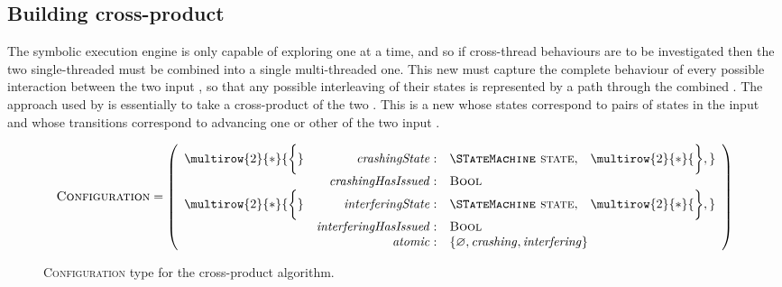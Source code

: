 \subsection{Building cross-product {\StateMachines}}
\label{sect:using:build_cross_product}



The symbolic execution engine is only capable of exploring one
{\StateMachine} at a time, and so if cross-thread behaviours are to be
investigated then the two single-threaded {\StateMachines} must be
combined into a single multi-threaded one.  This new {\StateMachine}
must capture the complete behaviour of every possible interaction
between the two input {\StateMachines}, so that any possible
interleaving of their states is represented by a path through the
combined {\StateMachine}.  The approach used by {\technique} is
essentially to take a cross-product of the two {\StateMachines}.  This
is a new {\StateMachine} whose states correspond to pairs of states in
the input {\StateMachine} and whose transitions correspond to
advancing one or other of the two input {\StateMachines}.

\begin{figure}
  \begin{displaymath}
    \textsc{Configuration} = \left(\begin{array}{rrll}
      \multirow{2}{*}{\bigg\{} & \mathit{crashingState}: & \textsc{{\STateMachine} state}, & \multirow{2}{*}{\bigg\},}\\
                               & \mathit{crashingHasIssued}: & \textsc{Bool}\\
      \multirow{2}{*}{\bigg\{} & \mathit{interferingState}: & \textsc{{\STateMachine} state}, & \multirow{2}{*}{\bigg\},} \\
                               & \mathit{interferingHasIssued}: & \textsc{Bool}\\
      \multicolumn{2}{r}{\mathit{atomic}:} & \multicolumn{2}{l}{\{ \varnothing, \mathit{crashing}, \mathit{interfering} \}}
    \end{array}\right)
  \end{displaymath}
  \caption{\textsc{Configuration} type for the cross-product algorithm.}
  \label{fig:cross_product:configuration}
\end{figure}

